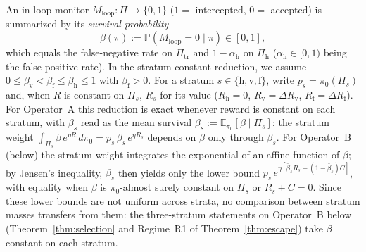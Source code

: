 \documentclass[11pt,a4paper]{article}
\newcommand{\E}{\mathbb{E}}
\newcommand{\Prob}{\mathbb{P}}
\begin{document}
An in-loop monitor $M_{\mathrm{loop}} : \Pi \to \{0, 1\}$ ($1 =$ intercepted, $0 =$ accepted) is summarized by its \emph{survival probability}
\begin{equation}
  \beta(\pi) := \Prob(M_{\mathrm{loop}} = 0 \mid \pi) \in [0, 1],
\end{equation}
which equals the false-negative rate on $\Pi_{\mathrm{tr}}$ and $1 - \alpha_{\mathrm{h}}$ on $\Pi_{\mathrm{h}}$ ($\alpha_{\mathrm{h}} \in [0, 1)$ being the false-positive rate). In the stratum-constant reduction, we assume $0 \le \beta_{\mathrm{v}} < \beta_{\mathrm{f}} \le \beta_{\mathrm{h}} \le 1$ with $\beta_{\mathrm{f}} > 0$. For a stratum $s \in \{\mathrm{h}, \mathrm{v}, \mathrm{f}\}$, write $p_s = \pi_0(\Pi_s)$ and, when $R$ is constant on $\Pi_s$, $R_s$ for its value ($R_{\mathrm{h}} = 0$, $R_{\mathrm{v}} = \Delta R_{\mathrm{v}}$, $R_{\mathrm{f}} = \Delta R_{\mathrm{f}}$). For Operator~A this reduction is exact whenever reward is constant on each stratum, with $\beta_s$ read as the mean survival $\bar\beta_s := \E_{\pi_0}[\beta \mid \Pi_s]$: the stratum weight $\int_{\Pi_s}\beta\,e^{\eta R}\,d\pi_0 = p_s\,\bar\beta_s\,e^{\eta R_s}$ depends on $\beta$ only through $\bar\beta_s$. For Operator~B (below) the stratum weight integrates the exponential of an affine function of $\beta$; by Jensen's inequality, $\bar\beta_s$ then yields only the lower bound $p_s\,e^{\eta[\bar\beta_s R_s - (1-\bar\beta_s)C]}$, with equality when $\beta$ is $\pi_0$-almost surely constant on $\Pi_s$ or $R_s + C = 0$. Since these lower bounds are not uniform across strata, no comparison between stratum masses transfers from them: the three-stratum statements on Operator~B below (Theorem~\ref{thm:selection} and Regime~R1 of Theorem~\ref{thm:escape}) take $\beta$ constant on each stratum.
\end{document}
